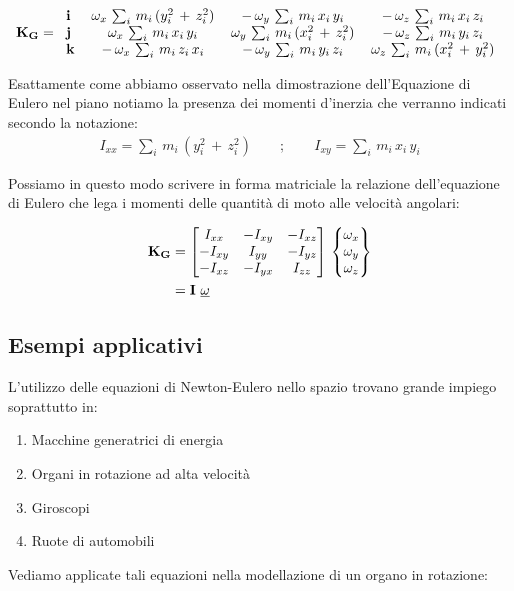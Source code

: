 \[
\mathbf{K_G} = 
\begin{tabular}{lccc}
$\mathbf{i}$&$\omega_x\,\sum_i\,m_i\,(y_i^2\,+\,z_i^2)$&$-\,\omega_y\,\sum_i\,m_i\,x_i\,y_i$&$-\,\omega_z\,\sum_i\,m_i\,x_i\,z_i$\\
$\mathbf{j}$&$\omega_x\,\sum_i\,m_i\,x_i\,y_i$&$\omega_y\,\sum_i\,m_i\,(x_i^2\,+\,z_i^2)$&$-\,\omega_z\,\sum_i\,m_i\,y_i\,z_i$\\
$\mathbf{k}$&$-\,\omega_x\,\sum_i\,m_i\,z_i\,x_i$&$-\,\omega_y\,\sum_i\,m_i\,y_i\,z_i$&$\omega_z\,\sum_i\,m_i\,(x_i^2\,+\,y_i^2)$
\end{tabular}
\]

Esattamente come abbiamo osservato nella dimostrazione dell'Equazione di Eulero nel piano notiamo la presenza dei momenti d'inerzia che verranno indicati secondo la notazione:
\begin{gather*}
	I_{xx} = \sum_i\,m_i\,(y_i^2\,+\,z_i^2)\qquad;\qquad I_{xy} = \sum_i\,m_i\,x_i\,y_i
\end{gather*}

Possiamo in questo modo scrivere in forma matriciale la relazione dell'equazione di Eulero che lega i momenti delle quantità di moto alle velocità angolari:

\begin{align*}
	\mathbf{K_G} &= \begin{bmatrix}I_{xx}&-I_{xy}&-I_{xz}\\-I_{xy}&I_{yy}&-I_{yz}\\-I_{xz}&-I_{yx}&I_{zz}\end{bmatrix}\,\begin{Bmatrix}\omega_x\\\omega_y\\\omega_z\end{Bmatrix}\\
	&= \mathbf{\mathbf{I}}\,\,\underline{\omega}
\end{align*}

\subsection{Esempi applicativi}

L'utilizzo delle equazioni di Newton-Eulero nello spazio trovano grande impiego soprattutto in:
\begin{enumerate}[$\longrightarrow$]
\item Macchine generatrici di energia
\item Organi in rotazione ad alta velocità
\item Giroscopi
\item Ruote di automobili
\end{enumerate}

Vediamo applicate tali equazioni nella modellazione di un organo in rotazione:


